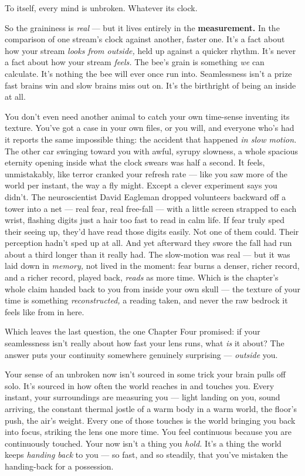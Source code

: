 \documentclass[11pt,openany]{book}
\begin{document}
To itself, every mind is unbroken. Whatever its clock.

So the graininess is \textit{real} — but it lives entirely in the \textbf{measurement.} In the comparison of one stream’s clock against another, faster one. It’s a fact about how your stream \textit{looks from outside,} held up against a quicker rhythm. It’s never a fact about how your stream \textit{feels.} The bee’s grain is something \textit{we} can calculate. It’s nothing the bee will ever once run into. Seamlessness isn’t a prize fast brains win and slow brains miss out on. It’s the birthright of being an inside at all.

You don’t even need another animal to catch your own time-sense inventing its texture. You’ve got a case in your own files, or you will, and everyone who’s had it reports the same impossible thing: the accident that happened \textit{in slow motion.} The other car swinging toward you with awful, syrupy slowness, a whole spacious eternity opening inside what the clock swears was half a second. It feels, unmistakably, like terror cranked your refresh rate — like you saw more of the world per instant, the way a fly might. Except a clever experiment says you didn’t. The neuroscientist David Eagleman dropped volunteers backward off a tower into a net — real fear, real free-fall — with a little screen strapped to each wrist, flashing digits just a hair too fast to read in calm life. If fear truly sped their seeing up, they’d have read those digits easily. Not one of them could. Their perception hadn’t sped up at all. And yet afterward they swore the fall had run about a third longer than it really had. The slow-motion was real — but it was laid down in \textit{memory,} not lived in the moment: fear burns a denser, richer record, and a richer record, played back, \textit{reads} as more time. Which is the chapter’s whole claim handed back to you from inside your own skull — the texture of your time is something \textit{reconstructed,} a reading taken, and never the raw bedrock it feels like from in here.

Which leaves the last question, the one Chapter Four promised: if your seamlessness isn’t really about how fast your lens runs, what \textit{is} it about? The answer puts your continuity somewhere genuinely surprising — \textit{outside} you.

Your sense of an unbroken now isn’t sourced in some trick your brain pulls off solo. It’s sourced in how often the world reaches in and touches you. Every instant, your surroundings are measuring you — light landing on you, sound arriving, the constant thermal jostle of a warm body in a warm world, the floor’s push, the air’s weight. Every one of those touches is the world bringing you back into focus, striking the lens one more time. You feel continuous because you are continuously touched. Your now isn’t a thing you \textit{hold.} It’s a thing the world keeps \textit{handing back} to you — so fast, and so steadily, that you’ve mistaken the handing-back for a possession.
\end{document}
